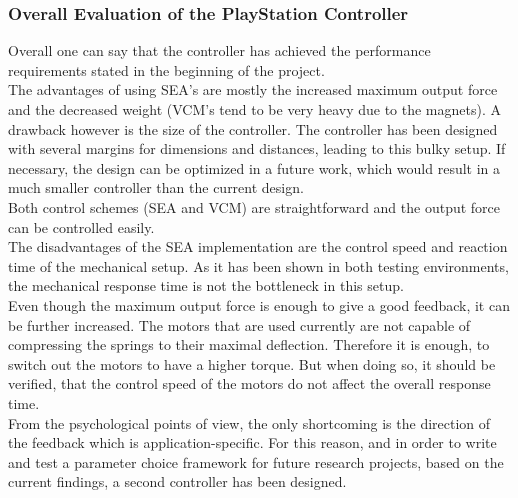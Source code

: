 \subsubsection{Overall Evaluation of the PlayStation Controller}
Overall one can say that the controller has achieved the performance requirements stated in the beginning of the project. \\ 
The advantages of using SEA's are mostly the increased maximum output force and the decreased weight (VCM's tend to be very heavy due to the magnets). A drawback however is the size of the controller. The controller has been designed with several margins for dimensions and distances, leading to this bulky setup. If necessary, the design can be optimized in a future work, which would result in a much smaller controller than the current design.\\
Both control schemes (SEA and VCM) are straightforward and the output force can be controlled easily.\\
The disadvantages of the SEA implementation are the control speed and reaction time of the mechanical setup. As it has been shown in both testing environments, the mechanical response time is not the bottleneck in this setup.\\
Even though the maximum output force is enough to give a good feedback, it can be further increased. The motors that are used currently are not capable of compressing the springs to their maximal deflection. Therefore it is enough, to switch out the motors to have a higher torque. But when doing so, it should be verified, that the control speed of the motors do not affect the overall response time.\\
From the psychological points of view, the only shortcoming is the direction of the feedback which is application-specific. For this reason, and in order to write and test a parameter choice framework for future research projects, based on the current findings, a second controller has been designed.\\
        

\newpage